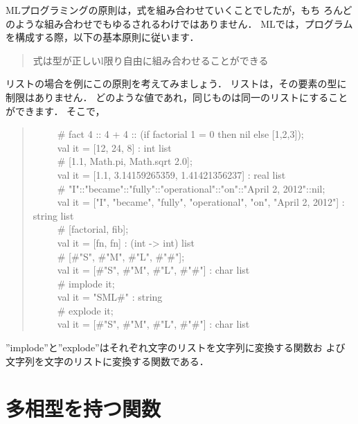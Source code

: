 \documentclass{jbook}
\newcommand{\myem}{\ \ \ \ \  }
\begin{document}
	MLプログラミングの原則は，式を組み合わせていくことでしたが，もち
ろんどのような組み合わせでもゆるされるわけではありません．
	MLでは，プログラムを構成する際，以下の基本原則に従います．
\begin{quote}
式は型が正しいl限り自由に組み合わせることができる
\end{quote}
	リストの場合を例にこの原則を考えてみましょう．
	リストは，その要素の型に制限はありません．
	どのような値であれ，同じものは同一のリストにすることができます．
	そこで，
\begin{tt}
\begin{quote}
\myem \# fact 4 :: 4 + 4 :: (if factorial 1 = 0 then nil else [1,2,3]);
\\\myem  val it = [12, 24, 8] : int list
\\\myem   \# [1.1, Math.pi, Math.sqrt 2.0];
\\\myem   val it = [1.1, 3.14159265359, 1.41421356237] : real list
\\\myem   \# "I"::"became"::"fully"::"operational"::"on"::"April 2, 2012"::nil;
\\\myem   val it = ["I", "became", "fully", "operational", "on", "April 2, 2012"] : string list
\\\myem   \# [factorial, fib];
\\\myem   val it = [fn, fn] : (int  -> int) list
\\\myem   \# [\#"S", \#"M", \#"L", \#"\#"];
\\\myem   val it = [\#"S", \#"M", \#"L", \#"\#"] : char list
\\\myem   \# implode it;
\\\myem   val it = "SML\#" : string
\\\myem   \# explode it;
\\\myem   val it = [\#"S", \#"M", \#"L", \#"\#"] : char list
\end{quote}
\end{tt}
''implode''と''explode''はそれぞれ文字のリストを文字列に変換する関数お
よび文字列を文字のリストに変換する関数である．

\section{多相型を持つ関数}
\label{sec:tutorialPolymorphicfunction}
\end{document}

